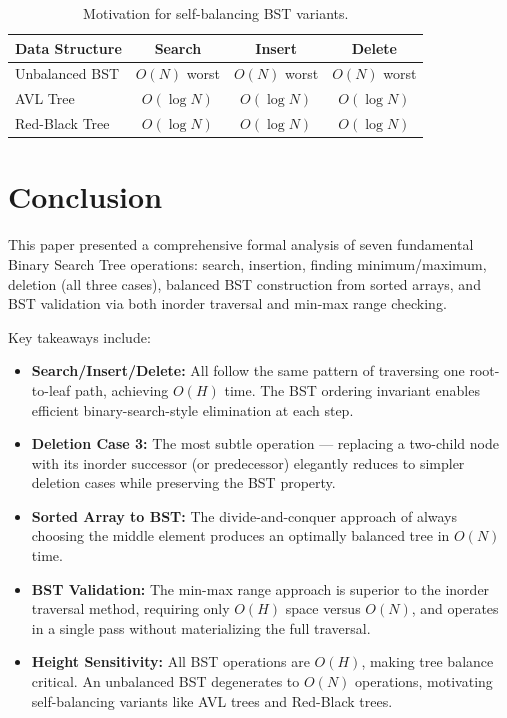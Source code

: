 \documentclass[10pt,journal,compsoc,onecolumn]{IEEEtran}
\begin{document}
\begin{table}[htbp]
\centering
\begin{tabular}{|l|c|c|c|}
\hline
\textbf{Data Structure} & \textbf{Search} & \textbf{Insert} & \textbf{Delete} \\
\hline
Unbalanced BST & $O(N)$ worst & $O(N)$ worst & $O(N)$ worst \\
AVL Tree & $O(\log N)$ & $O(\log N)$ & $O(\log N)$ \\
Red-Black Tree & $O(\log N)$ & $O(\log N)$ & $O(\log N)$ \\
\hline
\end{tabular}
\caption{Motivation for self-balancing BST variants.}
\end{table}

\section{Conclusion}

This paper presented a comprehensive formal analysis of seven fundamental Binary Search Tree operations: search, insertion, finding minimum/maximum, deletion (all three cases), balanced BST construction from sorted arrays, and BST validation via both inorder traversal and min-max range checking.

Key takeaways include:
\begin{itemize}
    \item \textbf{Search/Insert/Delete:} All follow the same pattern of traversing one root-to-leaf path, achieving $O(H)$ time. The BST ordering invariant enables efficient binary-search-style elimination at each step.
    \item \textbf{Deletion Case 3:} The most subtle operation --- replacing a two-child node with its inorder successor (or predecessor) elegantly reduces to simpler deletion cases while preserving the BST property.
    \item \textbf{Sorted Array to BST:} The divide-and-conquer approach of always choosing the middle element produces an optimally balanced tree in $O(N)$ time.
    \item \textbf{BST Validation:} The min-max range approach is superior to the inorder traversal method, requiring only $O(H)$ space versus $O(N)$, and operates in a single pass without materializing the full traversal.
    \item \textbf{Height Sensitivity:} All BST operations are $O(H)$, making tree balance critical. An unbalanced BST degenerates to $O(N)$ operations, motivating self-balancing variants like AVL trees and Red-Black trees.
\end{itemize}
\end{document}
